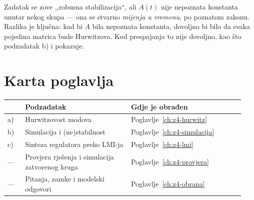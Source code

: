 \begin{zamka}
Zadatak se zove ,,robusna stabilizacija``, ali $A(t)$ nije nepoznata konstanta
unutar nekog skupa --- ona se stvarno \emph{mijenja u vremenu}, po poznatom
zakonu. Razlika je ključna: kad bi $A$ bila nepoznata konstanta, dovoljno bi bilo
da svaka pojedina matrica bude Hurwitzova. Kod prespajanja to nije dovoljno, kao
što podzadatak b) i pokazuje.
\end{zamka}

\section{Karta poglavlja}
\label{sec:z4-karta}

\begin{longtable}{@{}p{0.07\linewidth} p{0.42\linewidth} p{0.45\linewidth}@{}}
\toprule
& \textbf{Podzadatak} & \textbf{Gdje je obrađen} \\
\midrule
\endhead
a) & Hurwitzovost modova & Poglavlje~\ref{ch:z4-hurwitz} \\
b) & Simulacija i (ne)stabilnost & Poglavlje~\ref{ch:z4-simulacija} \\
c) & Sinteza regulatora preko LMI-ja & Poglavlje~\ref{ch:z4-lmi} \\
--- & Provjera rješenja i simulacija zatvorenog kruga & Poglavlje~\ref{ch:z4-provjera} \\
--- & Pitanja, zamke i modelski odgovori & Poglavlje~\ref{ch:z4-obrana} \\
\bottomrule
\end{longtable}
